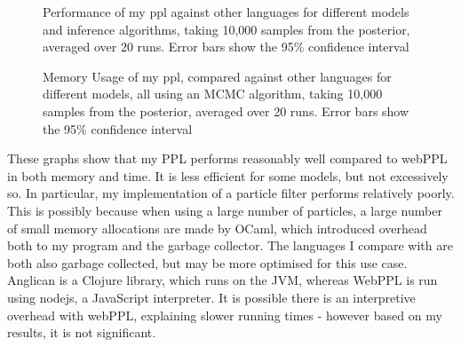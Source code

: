 			
\begin{figure}[!ht]
	\centering																									
	
	\caption{Performance of my ppl against other languages for different models and inference algorithms, taking 10,000 samples from the posterior, averaged over 20 runs. Error bars show the 95\% confidence interval}
	\label{fig:time-perf}
\end{figure}
			
\begin{figure}[!ht]
	\centering
																										
	\caption{Memory Usage of my ppl, compared against other languages for different models, all using an MCMC algorithm, taking 10,000 samples from the posterior, averaged over 20 runs. Error bars show the 95\% confidence interval}
	\label{fig:mem-perf}
\end{figure}
			
These graphs show that my PPL performs reasonably well compared to webPPL in both memory and time. It is less efficient for some models, but not excessively so. In particular, my implementation of a particle filter performs relatively poorly. This is possibly because when using a large number of particles, a large number of small memory allocations are made by OCaml, which introduced overhead both to my program and the garbage collector. The languages I compare with are both also garbage collected, but may be more optimised for this use case. Anglican is a Clojure library, which runs on the JVM, whereas WebPPL is run using nodejs, a JavaScript interpreter. It is possible there is an interpretive overhead with webPPL, explaining slower running times - however based on my results, it is not significant.

